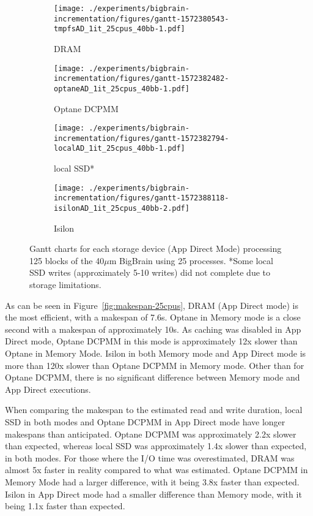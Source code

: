 \documentclass[conference]{IEEEtran}
\begin{document}
\begin{figure*}
    \begin{subfigure}{\columnwidth}
        \centering
    \texttt{[image: ./experiments/bigbrain-incrementation/figures/gantt-1572380543-tmpfsAD\_1it\_25cpus\_40bb-1.pdf]}
    \caption{DRAM}
\end{subfigure}
\begin{subfigure}{\columnwidth}
        \centering
    \texttt{[image: ./experiments/bigbrain-incrementation/figures/gantt-1572382482-optaneAD\_1it\_25cpus\_40bb-1.pdf]}
    \caption{Optane DCPMM}
\end{subfigure}
\begin{subfigure}{\columnwidth}
        \centering
    \texttt{[image: ./experiments/bigbrain-incrementation/figures/gantt-1572382794-localAD\_1it\_25cpus\_40bb-1.pdf]}
    \caption{local SSD*}
\end{subfigure}
\begin{subfigure}{\columnwidth}
        \centering
    \texttt{[image: ./experiments/bigbrain-incrementation/figures/gantt-1572388118-isilonAD\_1it\_25cpus\_40bb-2.pdf]}
    \caption{Isilon}\label{fig:gantt25isilon}
\end{subfigure}
    \captionsetup{belowskip=-10pt}
    \caption{Gantt charts for each storage device (App Direct Mode) processing 125 blocks of the 40$\mu$m BigBrain using 25 processes. *Some local SSD writes (approximately 5-10 writes) did not complete due to storage limitations.}\label{fig:gantt25}
\end{figure*}

As can be seen in Figure~\ref{fig:makespan-25cpus}, DRAM (App Direct mode) is the 
most efficient, with a makespan of 7.6s. Optane in Memory mode is a close second
with a makespan of approximately 10s. As caching was disabled in App Direct mode, 
Optane DCPMM in this mode is approximately 
12x slower than Optane in Memory Mode. Isilon in both Memory mode and App Direct 
mode is more than 120x slower than Optane DCPMM in Memory mode. Other than for Optane DCPMM, 
there is no significant difference between Memory mode and App Direct executions.

When comparing the makespan to the estimated read and write duration, local SSD
in both modes and Optane DCPMM in App Direct mode have longer makespans than anticipated.
Optane DCPMM was approximately 2.2x slower than expected, whereas local SSD was approximately
1.4x slower than expected, in both modes. For those where the I/O time was overestimated,
DRAM was almost 5x faster in reality compared to what was estimated. Optane DCPMM in Memory Mode
had a larger difference, with it being 3.8x faster than expected. Isilon in App Direct
mode had a smaller difference than Memory mode, with it being 1.1x faster than expected.
\end{document}
